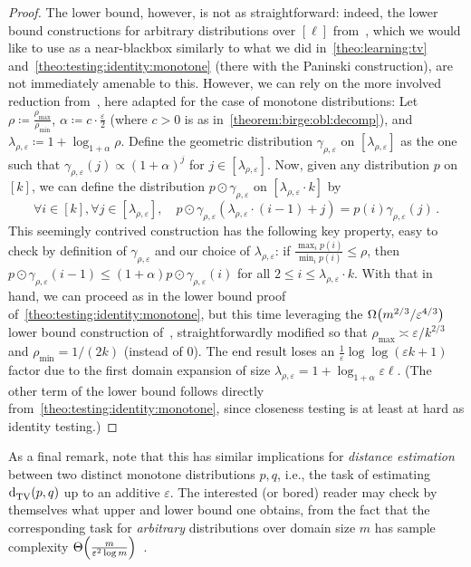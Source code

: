 \documentclass[11pt]{article}
\newcommand{\dst}{\varepsilon}
\newcommand{\ab}{k}
\renewcommand{\eqdef}{\coloneqq}
\newcommand{\p}{p}
\newcommand{\q}{q}
\begin{document}
\begin{proof}
The lower bound, however, is not as straightforward: indeed, the lower bound constructions for arbitrary distributions over $[\ell]$ from~\cite{Valiant:08,CDVV:14}, which we would like to use as a near-blackbox similarly to what we did in~\autoref{theo:learning:tv} and~\autoref{theo:testing:identity:monotone} (there with the Paninski construction), are not immediately amenable to this. However, we can rely on the more involved reduction from~\cite[Proposition 6]{DDSVV:12}, here adapted for the case of monotone distributions:
Let $\rho \eqdef \frac{\rho_{\max}}{\rho_{\min}}$, $\alpha \eqdef c\cdot\frac{\dst}{2}$ (where $c>0$ is as in~\autoref{theorem:birge:obl:decomp}), and $\lambda_{\rho,\dst} \eqdef 1+\log_{1+\alpha} \rho$. Define the geometric distribution $\gamma_{\rho,\dst}$ on $[\lambda_{\rho,\dst}]$ as the one such that $\gamma_{\rho,\dst}(j) \propto (1+\alpha)^j$ for $j\in[\lambda_{\rho,\dst}]$. Now, given any distribution $\p$ on $[\ab]$, we can define the distribution $\p\odot\gamma_{\rho,\dst}$ on $[\lambda_{\rho,\dst}\cdot\ab]$ by
\[
      \forall i \in[\ab], \forall j\in[\lambda_{\rho,\dst}], \quad \p\odot\gamma_{\rho,\dst}( \lambda_{\rho,\dst}\cdot (i-1) + j ) = \p(i)\gamma_{\rho,\dst}(j)\,.
\]
This seemingly contrived construction has the following key property, easy to check by definition of $\gamma_{\rho,\dst}$ and our choice of $\lambda_{\rho,\dst}$: if $\frac{\max_i \p(i)}{\min_i \p(i)} \leq \rho$, then $\p\odot\gamma_{\rho,\dst}(i-1)\leq (1+\alpha)\p\odot\gamma_{\rho,\dst}(i)$ for all $2\leq i \leq \lambda_{\rho,\dst}\cdot\ab$. With that in hand, we can proceed as in the lower bound proof of~\autoref{theo:testing:identity:monotone}, but this time leveraging the $\bigOmega{m^{2/3}/\dst^{4/3}}$ lower bound construction of~\cite{CDVV:14}, straightforwardly modified so that $\rho_{\max} \asymp \dst/\ab^{2/3}$ and $\rho_{\min} = 1/(2\ab)$ (instead of $0$). The end result loses an $\frac{1}{\dst}\log\log(\dst\ab + 1)$ factor due to the first domain expansion of size $\lambda_{\rho,\dst} = 1+\log_{1+\alpha} \dst\ell$. (The other term of the lower bound follows directly from~\autoref{theo:testing:identity:monotone}, since closeness testing is at least at hard as identity testing.)
\end{proof}

As a final remark, note that this has similar implications for \emph{distance estimation} between two distinct monotone distributions $\p,\q$, i.e., the task of estimating $\totalvardist{\p}{\q}$ up to an additive $\dst$. The interested (or bored) reader may check by themselves what upper and lower bound one obtains, from the fact that the corresponding task for \emph{arbitrary} distributions over domain size $m$ has sample complexity $\bigTheta{\frac{m}{\dst^2\log m}}$~\cite{VV:11,JHW:18}.
\end{document}
